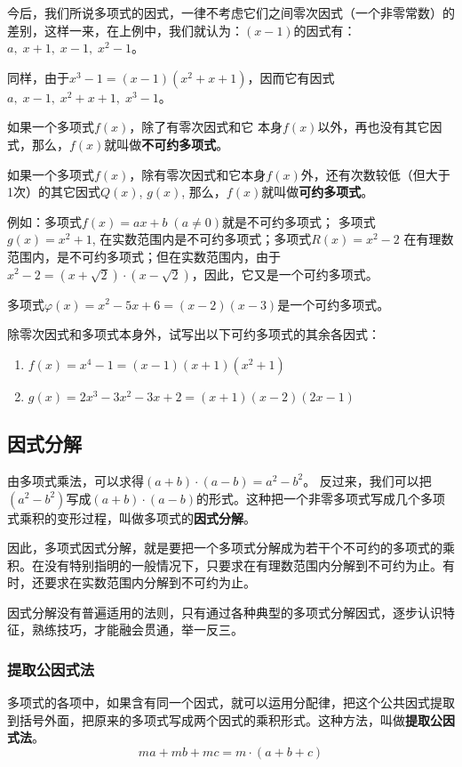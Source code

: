 今后，我们所说多项式的因式，一律不考虑它们之间零次因式（一个非零常数）的差别，这样一来，在上例中，我们就认为：$(x-1)$的因式有：$a,\; x+1,\; x-1,\; x^2-1$。

同样，由于$x^3-1=(x-1)(x^2+x+1)$，因而它有因式$a,\; x-1,\; x^2+x+1,\; x^3-1$。

如果一个多项式$f(x)$，除了有零次因式和它
本身$f(x)$以外，再也没有其它因式，那么，$f(x)$就叫做\textbf{不可约多项式}。

如果一个多项式$f(x)$，除有零次因式和它本身$f(x)$外，还有次数较低（但大于1次）的其它因式$Q(x)$, $g(x)$, 那么，$f(x)$就叫做\textbf{可约多项式}。

例如：多项式$f(x)=ax+b\; (a\ne 0)$就是不可约多项式；
多项式$g(x)=x^2+1$, 在实数范围内是不可约多项式；多项式$R(x)=x^2-2$ 在有理数范围内，是不可约多项式；但在实数范围内，由于$x^2-2=(x+\sqrt{2})\cdot (x-\sqrt{2})$，因此，它又是一个可约多项式。

多项式$\varphi(x)=x^2-5x+6=(x-2)(x-3)$是一个可约多项式。

\begin{ex}
    除零次因式和多项式本身外，试写出以下可约多项式的其余各因式：
    \begin{enumerate}
        \item $f (x) =x^4-1= (x-1) (x+1)(x^2+1)$
        \item $g (x) =2x^3-3x^2-3x+2= (x+1) (x-2)(2x-1)$
    \end{enumerate} 
\end{ex}

\subsection{因式分解}
由多项式乘法，可以求得$(a+b)\cdot (a-b)=a^2-b^2$。
反过来，我们可以把$(a^2-b^2)$写成$(a+b)\cdot (a-b)$的形式。这种把一个非零多项式写成几个多项式乘积的变形过程，叫做多项式的\textbf{因式分解}。

因此，多项式因式分解，就是要把一个多项式分解成为若干个不可约的多项式的乘积。在没有特别指明的一般情况下，只要求在有理数范围内分解到不可约为止。有时，还要求在实数范围内分解到不可约为止。

因式分解没有普遍适用的法则，只有通过各种典型的多项式分解因式，逐步认识特征，熟练技巧，才能融会贯通，举一反三。

\subsubsection{提取公因式法}
多项式的各项中，如果含有同一个因式，就可以运用分配律，把这个公共因式提取到括号外面，把原来的多项式写成两个因式的乘积形式。这种方法，叫做\textbf{提取公因式法}。
\[ma+mb+mc=m\cdot (a+b+c)\]


